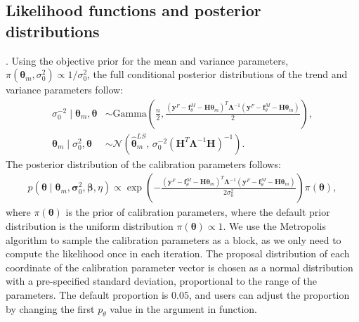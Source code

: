 \subsection{Likelihood functions and posterior distributions}

.  
Using the objective prior for the mean and variance parameters, $\pi(\bm \theta_m, \sigma^2_0)\propto 1/\sigma^2_0$,  the full conditional posterior distributions of the trend and variance parameters follow:  
\begin{align*}
 \sigma^{-2}_0 \mid \bm \theta_m,  \bm \theta &\sim \mbox{Gamma}\left(\frac{n}{2},  \frac{(\mathbf y^F-\mathbf f^M_{\theta}- \mathbf H \bm \theta_m )^T\bm \Lambda^{-1}(\mathbf y^F-\mathbf f^M_{\theta}- \mathbf H \bm \theta_m )}{2}  \right), \\ 
\bm \theta_m \mid \sigma^2_0, \bm \theta &\sim \mathcal N\left(   \bm { \hat \theta}^{LS}_m, \,  \sigma^{-2}_0(\mathbf H^T\bm \Lambda^{-1} \mathbf H)^{-1} \right).  
\end{align*}
The posterior distribution of the calibration parameters follows:  
\begin{align*}
p(\bm \theta \mid \bm \theta_m, \bm \sigma^{2}_0, \bm \beta, \eta )\propto \exp\left( - \frac{(\mathbf y^F-\mathbf f^M_{\theta}- \mathbf H \bm \theta_m )^T\bm \Lambda^{-1}(\mathbf y^F-\mathbf f^M_{\theta}- \mathbf H \bm \theta_m )  }{2\sigma^2_0}\right)\pi(\bm \theta),
\end{align*}
where $\pi(\bm \theta)$ is the prior of calibration parameters, where the default prior distribution is the uniform distribution $\pi(\bm \theta)\propto 1$.  We use the Metropolis algorithm to sample the calibration parameters as a block, as we only need to compute the likelihood once in each iteration. The proposal distribution of each coordinate of the calibration parameter vector is chosen as a normal distribution with a pre-specified standard deviation,   proportional to the range of the parameters. The default proportion is $0.05$, and users can adjust the proportion by changing the first $p_{\theta}$ value in the argument  in  function.  

